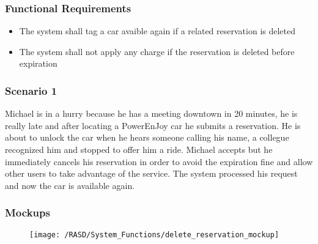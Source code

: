 \subsubsection{Functional Requirements}
\begin{itemize}
  \item The system shall tag a car avaible again if a related reservation is deleted
  \item The system shall not apply any charge if the reservation is deleted before expiration
\end{itemize}


\subsubsection{Scenario 1}
Michael is in a hurry because he has a meeting downtown in 20 minutes, he is really late and after locating a PowerEnJoy car he submits a reservation. He is about to unlock the car when he hears someone calling his name, a collegue recognized him and stopped to offer him a ride. Michael accepts but he immediately cancels his reservation in order to avoid the expiration fine and allow other users to take advantage of the service. The system processed his request and now the car is available again. 


\subsubsection{Mockups}
\begin{figure}[!ht]
  \centering
  \vspace{0.2cm}
  \texttt{[image: /RASD/System\_Functions/delete\_reservation\_mockup]}\\
  \vspace{0.4cm}
  \label{fig:delete_reservation} 
\end{figure}


